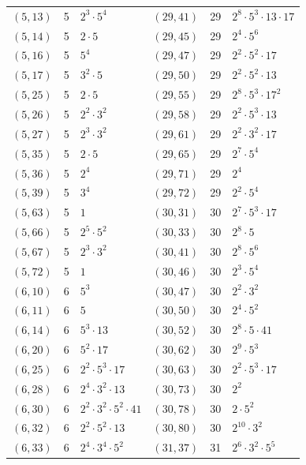 \documentclass[11pt]{article}
\begin{document}
\begin{longtable}{@{}lrl@{\qquad}lrl@{}}
$(5,13)$ & 5 & $2^{3}\cdot 5^{4}$ & $(29,41)$ & 29 & $2^{8}\cdot 5^{3}\cdot 13\cdot 17$\\
$(5,14)$ & 5 & $2\cdot 5$ & $(29,45)$ & 29 & $2^{4}\cdot 5^{6}$\\
$(5,16)$ & 5 & $5^{4}$ & $(29,47)$ & 29 & $2^{2}\cdot 5^{2}\cdot 17$\\
$(5,17)$ & 5 & $3^{2}\cdot 5$ & $(29,50)$ & 29 & $2^{2}\cdot 5^{2}\cdot 13$\\
$(5,25)$ & 5 & $2\cdot 5$ & $(29,55)$ & 29 & $2^{8}\cdot 5^{3}\cdot 17^{2}$\\
$(5,26)$ & 5 & $2^{2}\cdot 3^{2}$ & $(29,58)$ & 29 & $2^{2}\cdot 5^{3}\cdot 13$\\
$(5,27)$ & 5 & $2^{3}\cdot 3^{2}$ & $(29,61)$ & 29 & $2^{2}\cdot 3^{2}\cdot 17$\\
$(5,35)$ & 5 & $2\cdot 5$ & $(29,65)$ & 29 & $2^{7}\cdot 5^{4}$\\
$(5,36)$ & 5 & $2^{4}$ & $(29,71)$ & 29 & $2^{4}$\\
$(5,39)$ & 5 & $3^{4}$ & $(29,72)$ & 29 & $2^{2}\cdot 5^{4}$\\
$(5,63)$ & 5 & $1$ & $(30,31)$ & 30 & $2^{7}\cdot 5^{3}\cdot 17$\\
$(5,66)$ & 5 & $2^{5}\cdot 5^{2}$ & $(30,33)$ & 30 & $2^{8}\cdot 5$\\
$(5,67)$ & 5 & $2^{3}\cdot 3^{2}$ & $(30,41)$ & 30 & $2^{8}\cdot 5^{6}$\\
$(5,72)$ & 5 & $1$ & $(30,46)$ & 30 & $2^{3}\cdot 5^{4}$\\
$(6,10)$ & 6 & $5^{3}$ & $(30,47)$ & 30 & $2^{2}\cdot 3^{2}$\\
$(6,11)$ & 6 & $5$ & $(30,50)$ & 30 & $2^{4}\cdot 5^{2}$\\
$(6,14)$ & 6 & $5^{3}\cdot 13$ & $(30,52)$ & 30 & $2^{8}\cdot 5\cdot 41$\\
$(6,20)$ & 6 & $5^{2}\cdot 17$ & $(30,62)$ & 30 & $2^{9}\cdot 5^{3}$\\
$(6,25)$ & 6 & $2^{2}\cdot 5^{3}\cdot 17$ & $(30,63)$ & 30 & $2^{2}\cdot 5^{3}\cdot 17$\\
$(6,28)$ & 6 & $2^{4}\cdot 3^{2}\cdot 13$ & $(30,73)$ & 30 & $2^{2}$\\
$(6,30)$ & 6 & $2^{2}\cdot 3^{2}\cdot 5^{2}\cdot 41$ & $(30,78)$ & 30 & $2\cdot 5^{2}$\\
$(6,32)$ & 6 & $2^{2}\cdot 5^{2}\cdot 13$ & $(30,80)$ & 30 & $2^{10}\cdot 3^{2}$\\
$(6,33)$ & 6 & $2^{4}\cdot 3^{4}\cdot 5^{2}$ & $(31,37)$ & 31 & $2^{6}\cdot 3^{2}\cdot 5^{5}$\\

\end{longtable}
\end{document}
